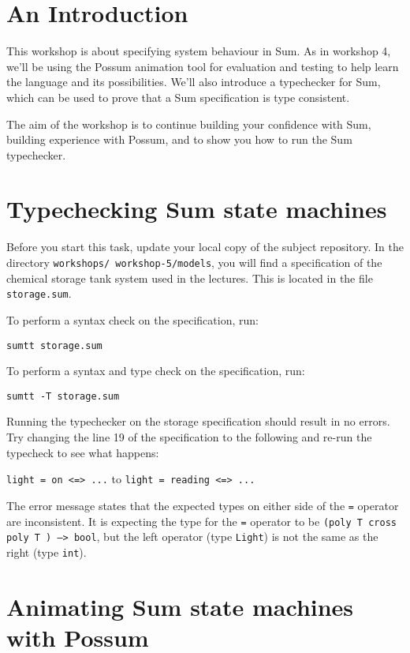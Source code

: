 \documentclass{article}
\begin{document}
%
\lstset{language=}

\section*{An Introduction}

This workshop is about specifying system behaviour in Sum. As in workshop 4, we'll be using the Possum animation tool for evaluation and testing to help learn the language and its possibilities. We'll also introduce a typechecker for Sum, which can be used to prove that a Sum specification is type consistent.

The aim of the workshop is to continue building your confidence with Sum, building experience with Possum, and to show you how to run the Sum typechecker.

\section*{Typechecking Sum state machines}

Before you start this task, update your local copy of the subject repository. In the directory \texttt{workshops/ workshop-5/models}, you will find a specification of the chemical storage tank system used in the lectures. This is located in the file \texttt{storage.sum}.

To perform a syntax check on the specification, run:

 \quad\quad \texttt{sumtt storage.sum}

To perform a syntax and type check on the specification, run:

 \quad\quad \texttt{sumtt -T storage.sum}

Running the typechecker on the storage specification should result in no errors. Try changing the line 19 of the specification to the following and re-run the typecheck to see what happens:

\quad\quad \texttt{light = on <=> ...}   to  \texttt{light = reading <=> ...}

The error message states that the expected types on either side of the \texttt{=} operator are inconsistent. It is expecting the type for the \texttt{=} operator to be \texttt{(poly T cross poly T )  --> bool}, but the left operator (type \texttt{Light}) is not the same as the right (type \texttt{int}).

\section*{Animating Sum state machines with Possum}
\end{document}
